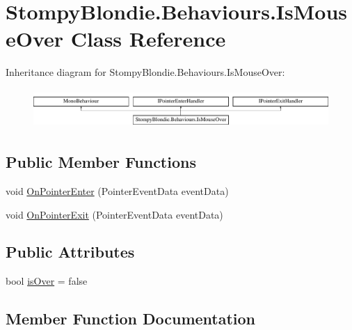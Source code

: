 \hypertarget{class_stompy_blondie_1_1_behaviours_1_1_is_mouse_over}{}\section{Stompy\+Blondie.\+Behaviours.\+Is\+Mouse\+Over Class Reference}
\label{class_stompy_blondie_1_1_behaviours_1_1_is_mouse_over}
Inheritance diagram for Stompy\+Blondie.\+Behaviours.\+Is\+Mouse\+Over\+:\begin{figure}[H]
\begin{center}
\leavevmode
\includegraphics[height=1.487384cm]{class_stompy_blondie_1_1_behaviours_1_1_is_mouse_over}
\end{center}
\end{figure}
\subsection*{Public Member Functions}
\begin{DoxyCompactItemize}
\item 
void \mbox{\hyperlink{class_stompy_blondie_1_1_behaviours_1_1_is_mouse_over_ad8eda7c464bd30cf1104447052e04e32}{On\+Pointer\+Enter}} (Pointer\+Event\+Data event\+Data)
\item 
void \mbox{\hyperlink{class_stompy_blondie_1_1_behaviours_1_1_is_mouse_over_ad624ad1de28269173b245a8456d34ef8}{On\+Pointer\+Exit}} (Pointer\+Event\+Data event\+Data)
\end{DoxyCompactItemize}
\subsection*{Public Attributes}
\begin{DoxyCompactItemize}
\item 
bool \mbox{\hyperlink{class_stompy_blondie_1_1_behaviours_1_1_is_mouse_over_a4b31cf2a692c0cdf41c04d399a70c332}{is\+Over}} = false
\end{DoxyCompactItemize}


\subsection{Member Function Documentation}
\mbox{\label{class_stompy_blondie_1_1_behaviours_1_1_is_mouse_over_ad8eda7c464bd30cf1104447052e04e32}} 
